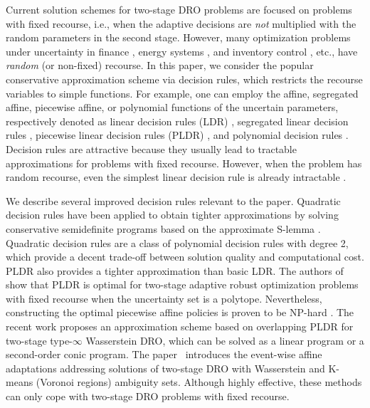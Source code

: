\documentclass{article}
\begin{document}
Current solution schemes for two-stage DRO problems are focused on problems with fixed recourse, i.e., when the adaptive decisions are \emph{not} multiplied with the random parameters in the second stage. However, many optimization problems under uncertainty in finance \cite{Random-Recourse-Robust-1, Random-Recourse-Stochastic-2, Random-Recourse-Stochastic-4}, energy systems \cite{Random-Recourse-Stochastic-3}, and inventory control \cite{Random-Recourse-Stochastic-1}, etc.,  have \emph{random} (or non-fixed) recourse. In this paper, we consider the popular conservative approximation scheme via decision rules, which restricts the recourse variables to simple functions. For example, one can employ the affine, segregated affine, piecewise affine, or polynomial functions of the uncertain parameters, respectively denoted as linear decision rules (LDR) \cite{LDR1, LDR2, Linear-decision-rule, LDR3,LDR4, LDR5, LDR6,LDR7,LDR8}, segregated linear decision rules \cite{DRO-SLDR2, DRO-SLDR1}, piecewise linear decision rules (PLDR) \cite{PLDR1-NPhard, PLDR3-NPhard, PLDR2}, and polynomial decision rules \cite{PDR-2, PDR-QDR1}. Decision rules are attractive because they usually lead to tractable approximations for problems with fixed recourse. %
However, when the problem has random recourse, even the simplest linear decision rule is already intractable %
 \cite{Linear-decision-rule, Random-Recourse-NPhard}. 

We describe several improved decision rules relevant to the paper. Quadratic decision rules have been applied to obtain tighter approximations by solving conservative semidefinite programs \cite{PDR-QDR1,QDR-2} based on the approximate S-lemma \cite{QDR-Slemma}.  Quadratic decision rules are a class of polynomial decision rules with degree 2, which provide a decent trade-off between solution quality and computational cost. PLDR also provides a tighter approximation than basic LDR. The authors of \cite{PLDR-optimal} show that PLDR is optimal for two-stage adaptive robust optimization problems with fixed recourse when the uncertainty set is a polytope. Nevertheless, constructing the optimal piecewise affine policies is proven to be NP-hard \cite{PLDR4_NPhard}. The recent work \cite{two-stage-sampling-robust} proposes an approximation scheme based on overlapping PLDR for two-stage type-$\infty$ Wasserstein DRO, which can be solved as a linear program or a second-order conic program. The paper~\cite{DRO-solution-3} introduces the event-wise affine adaptations addressing solutions of two-stage DRO with Wasserstein and K-means (Voronoi regions) ambiguity sets. Although highly effective, these methods can only cope with two-stage DRO problems with fixed recourse. %
\end{document}
